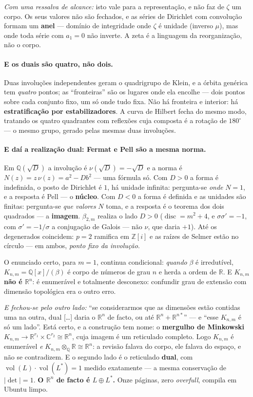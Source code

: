 \documentclass[11pt]{article}
\newcommand{\Z}{\mathbb Z}
\newcommand{\R}{\mathbb R}
\newcommand{\Q}{\mathbb Q}
\newcommand{\C}{\mathbb C}
\theoremstyle{plain}
\theoremstyle{remark}
\begin{document}
\begin{itemize}
\emph{Com uma ressalva de alcance:} isto vale para a representação, e não faz de $\zeta$ um corpo.
Os seus valores não são fechados, e as séries de Dirichlet com convolução formam um \textbf{anel}
--- domínio de integridade onde $\zeta$ é unidade (inverso $\mu$), mas onde toda série com $a_1=0$
não inverte. A zeta é a linguagem da reorganização, não o corpo.

\paragraph{E os duais são quatro, não dois.} Duas involuções independentes geram o quadrigrupo de
Klein, e a órbita genérica tem \emph{quatro} pontos; as ``fronteiras'' são os lugares onde ela
encolhe --- dois pontos sobre cada conjunto fixo, um só onde tudo fixa. Não há fronteira e
interior: há \textbf{estratificação por estabilizadores}. A curva de Hilbert fecha do mesmo modo,
tratando os quatro quadrantes com reflexões cuja composta é a rotação de $180^\circ$ --- o mesmo
grupo, gerado pelas mesmas duas involuções.

\paragraph{E daí a realização dual: Fermat e Pell são a mesma norma.} Em $\Q(\sqrt D)$ a involução
é $\nu(\sqrt D)=-\sqrt D$ e a norma é $N(z) = z\,\nu(z) = a^2-Db^2$ --- uma fórmula só. Com $D>0$ a
forma é indefinida, o posto de Dirichlet é $1$, há unidade infinita: pergunta-se \emph{onde} $N=1$,
e a resposta é Pell --- o \textbf{núcleo}. Com $D<0$ a forma é definida e as unidades são finitas:
pergunta-se \emph{que valores} $N$ toma, e a resposta é o teorema dos dois quadrados --- a
\textbf{imagem}. $\beta_{2,m}$ realiza o lado $D>0$ ($\operatorname{disc} = m^2+4$, e
$\sigma\sigma' = -1$, com $\sigma' = -1/\sigma$ a conjugação de Galois --- não $\nu$, que daria $+1$). Até os degenerados coincidem: $p=2$ ramifica em $\Z[i]$ e as raízes de
Selmer estão no círculo --- em ambos, \emph{ponto fixo da involução}.

O enunciado certo, para $m=1$, continua condicional: \emph{quando} $\beta$ é irredutível, $K_{n,m} = \Q[x]/(\beta)$ é
corpo de números de grau $n$ e herda a ordem de $\R$. E \textbf{$K_{n,m}$ não é $\R^n$}: é
enumerável e totalmente desconexo: confundir grau de extensão com dimensão topológica era o outro
erro.

\emph{E fechou-se pelo outro lado:} ``se considerarmos que as dimensões estão contidas uma na
outra, dual [\ldots] daria o $\R^n$ de facto, ou até $\R^n + \R^{n*}$'' --- e ``esse $K_{n,m}$ é só
um lado''. Está certo, e a construção tem nome: o \textbf{mergulho de Minkowski}
$K_{n,m}\to\R^{r_1}\times\C^{r_2}\cong\R^n$, cuja imagem é um reticulado completo. Logo $K_{n,m}$ é
enumerável \emph{e} $K_{n,m}\otimes_\Q\R\cong\R^n$: a revisão falava do corpo, ele falava do espaço,
e não se contradizem. E o segundo lado é o reticulado \textbf{dual}, com
$\operatorname{vol}(L)\cdot\operatorname{vol}(L^*) = 1$ medido exatamente --- a mesma conservação de
$|\det|=1$. \textbf{O $\R^n$ de facto é $L\oplus L^*$.} Onze páginas, zero \emph{overfull}, compila
em Ubuntu limpo.


\end{itemize}
\end{document}
